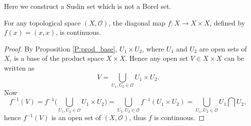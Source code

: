 
Here we construct a Suslin set which is not a Borel set.

\begin{lemma} \label{L:diag_map}
  For any topological space $(X,\mathcal{O})$, the diagonal map 
  $f:X\to X\times X$, defined by $f(x)=(x,x)$, is continuous.
\end{lemma}
\begin{proof}
  By Proposition \ref{P:prod_base}, $U_1\times U_2$, where $U_1$ and $U_2$
  are open sets of $X$, is a base of the product space $X\times X$. Hence
  any open set $V\in X\times X$ can be written as
  \[
    V = \bigcup_{U_1,U_2\in \mathcal{O}} U_1\times U_2.
  \]
  Now
  \[
    f^{-1}(V) = f^{-1} \big( \bigcup_{U_1,U_2\in \mathcal{O}} U_1\times U_2 \big)
      = \bigcup_{U_1,U_2\in \mathcal{O}} f^{-1}(U_1\times U_2)
      = \bigcup_{U_1,U_2\in \mathcal{O}} U_1\bigcap U_2,
  \]
  hence $f^{-1}(V)$ is an open set of $(X,\mathcal{O})$, thus $f$ is continuous.
\end{proof}

